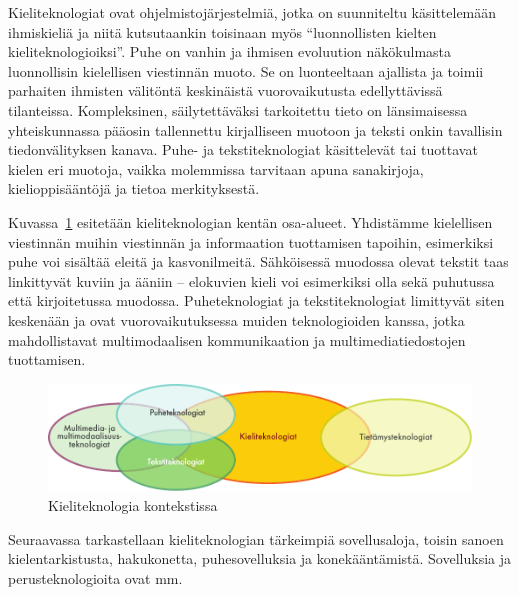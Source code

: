 \clearpage
{}

\begin{multicols}{2}
Kieliteknologiat ovat ohjelmistojärjestelmiä, jotka on suunniteltu käsittelemään ihmiskieliä ja niitä kutsutaankin toisinaan myös ``luonnollisten kielten kieliteknologioiksi''. Puhe on vanhin ja ihmisen evoluution näkökulmasta luonnollisin kielellisen viestinnän muoto. Se on luonteeltaan ajallista ja toimii parhaiten ihmisten välitöntä keskinäistä vuorovaikutusta edellyttävissä tilanteissa.  Kompleksinen, säilytettäväksi tarkoitettu tieto on länsimaisessa yhteiskunnassa pääosin tallennettu kirjalliseen muotoon ja teksti onkin tavallisin tiedonvälityksen kanava. Puhe- ja tekstiteknologiat käsittelevät tai tuottavat kielen eri muotoja, vaikka molemmissa tarvitaan apuna sanakirjoja, kielioppisääntöjä ja tietoa merkityksestä.

Kuvassa~\ref{fig:ltincontext-fin} esitetään kieliteknologian kentän osa-alueet.  Yhdistämme kielellisen viestinnän muihin viestinnän ja informaation tuottamisen tapoihin, esimerkiksi puhe voi sisältää eleitä ja kasvonilmeitä. Sähköisessä muodossa olevat tekstit taas linkittyvät kuviin ja ääniin -- elokuvien kieli voi esimerkiksi olla sekä puhutussa että kirjoitetussa muodossa. Puheteknologiat ja tekstiteknologiat limittyvät siten keskenään ja ovat vuorovaikutuksessa muiden teknologioiden kanssa, jotka mahdollistavat multimodaalisen kommunikaation ja multimediatiedostojen tuottamisen.

\begin{figure}[htb]
  \center
  \includegraphics[width=\textwidth]{../_media/finnish/language_technologies}
  \caption{Kieliteknologia kontekstissa}
  \label{fig:ltincontext-fin}
\end{figure}

Seuraavassa tarkastellaan kieliteknologian tärkeimpiä sovellusaloja, toisin sanoen kielentarkistusta, hakukonetta, puhesovelluksia ja konekääntämistä.  Sovelluksia ja perusteknologioita ovat mm.


\end{multicols}
